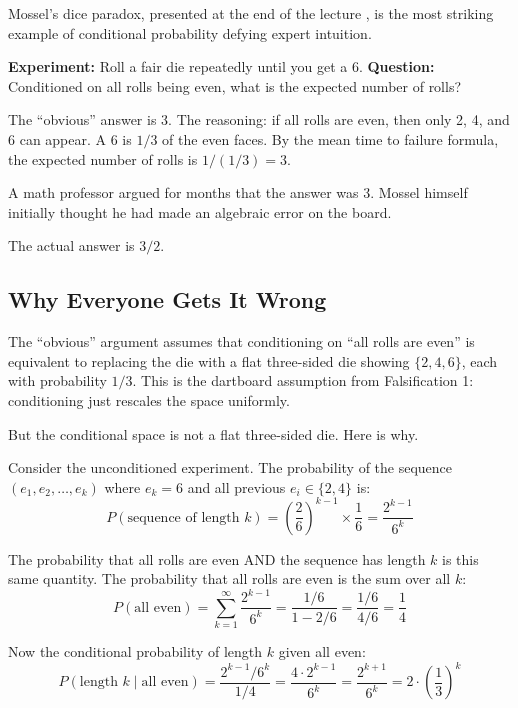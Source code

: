 \documentclass[12pt]{article}
\begin{document}
Mossel's dice paradox, presented at the end of the lecture \cite{mossel2010}, is the most striking example of conditional probability defying expert intuition.

\textbf{Experiment:} Roll a fair die repeatedly until you get a 6. \textbf{Question:} Conditioned on all rolls being even, what is the expected number of rolls?

The ``obvious'' answer is 3. The reasoning: if all rolls are even, then only 2, 4, and 6 can appear. A 6 is $1/3$ of the even faces. By the mean time to failure formula, the expected number of rolls is $1/(1/3) = 3$.

A math professor argued for months that the answer was 3. Mossel himself initially thought he had made an algebraic error on the board.

The actual answer is $3/2$.

\subsection{Why Everyone Gets It Wrong}

The ``obvious'' argument assumes that conditioning on ``all rolls are even'' is equivalent to replacing the die with a flat three-sided die showing $\{2, 4, 6\}$, each with probability $1/3$. This is the dartboard assumption from Falsification 1: conditioning just rescales the space uniformly.

But the conditional space is not a flat three-sided die. Here is why.

Consider the unconditioned experiment. The probability of the sequence $(e_1, e_2, \ldots, e_k)$ where $e_k = 6$ and all previous $e_i \in \{2,4\}$ is:
\begin{equation}
P(\text{sequence of length } k) = \left(\frac{2}{6}\right)^{k-1} \times \frac{1}{6} = \frac{2^{k-1}}{6^k}
\end{equation}

The probability that all rolls are even AND the sequence has length $k$ is this same quantity. The probability that all rolls are even is the sum over all $k$:
\begin{equation}
P(\text{all even}) = \sum_{k=1}^{\infty} \frac{2^{k-1}}{6^k} = \frac{1/6}{1 - 2/6} = \frac{1/6}{4/6} = \frac{1}{4}
\end{equation}

Now the conditional probability of length $k$ given all even:
\begin{equation}
P(\text{length } k \mid \text{all even}) = \frac{2^{k-1}/6^k}{1/4} = \frac{4 \cdot 2^{k-1}}{6^k} = \frac{2^{k+1}}{6^k} = 2 \cdot \left(\frac{1}{3}\right)^k
\end{equation}
\end{document}

